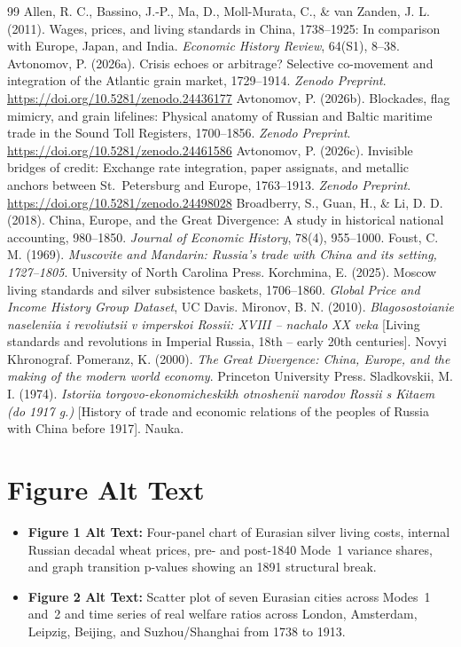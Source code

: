 \documentclass[11pt,a4paper]{article}
\begin{document}
\begin{thebibliography}{99}
Allen, R. C., Bassino, J.-P., Ma, D., Moll-Murata, C., \& van Zanden, J. L. (2011). Wages, prices, and living standards in China, 1738--1925: In comparison with Europe, Japan, and India. \emph{Economic History Review}, 64(S1), 8--38.
Avtonomov, P. (2026a). Crisis echoes or arbitrage? Selective co-movement and integration of the Atlantic grain market, 1729--1914. \emph{Zenodo Preprint}. \url{https://doi.org/10.5281/zenodo.24436177}
Avtonomov, P. (2026b). Blockades, flag mimicry, and grain lifelines: Physical anatomy of Russian and Baltic maritime trade in the Sound Toll Registers, 1700--1856. \emph{Zenodo Preprint}. \url{https://doi.org/10.5281/zenodo.24461586}
Avtonomov, P. (2026c). Invisible bridges of credit: Exchange rate integration, paper assignats, and metallic anchors between St.~Petersburg and Europe, 1763--1913. \emph{Zenodo Preprint}. \url{https://doi.org/10.5281/zenodo.24498028}
Broadberry, S., Guan, H., \& Li, D. D. (2018). China, Europe, and the Great Divergence: A study in historical national accounting, 980--1850. \emph{Journal of Economic History}, 78(4), 955--1000.
Foust, C. M. (1969). \emph{Muscovite and Mandarin: Russia's trade with China and its setting, 1727--1805}. University of North Carolina Press.
Korchmina, E. (2025). Moscow living standards and silver subsistence baskets, 1706--1860. \emph{Global Price and Income History Group Dataset}, UC Davis.
Mironov, B. N. (2010). \emph{Blagosostoianie naseleniia i revoliutsii v imperskoi Rossii: XVIII -- nachalo XX veka} [Living standards and revolutions in Imperial Russia, 18th -- early 20th centuries]. Novyi Khronograf.
Pomeranz, K. (2000). \emph{The Great Divergence: China, Europe, and the making of the modern world economy}. Princeton University Press.
Sladkovskii, M. I. (1974). \emph{Istoriia torgovo-ekonomicheskikh otnoshenii narodov Rossii s Kitaem (do 1917 g.)} [History of trade and economic relations of the peoples of Russia with China before 1917]. Nauka.
\end{thebibliography}
\section*{Figure Alt Text}
\begin{itemize}
\item \textbf{Figure 1 Alt Text:} Four-panel chart of Eurasian silver living costs, internal Russian decadal wheat prices, pre- and post-1840 Mode~1 variance shares, and graph transition p-values showing an 1891 structural break.
\item \textbf{Figure 2 Alt Text:} Scatter plot of seven Eurasian cities across Modes~1 and~2 and time series of real welfare ratios across London, Amsterdam, Leipzig, Beijing, and Suzhou/Shanghai from 1738 to 1913.
\end{itemize}
\end{document}
